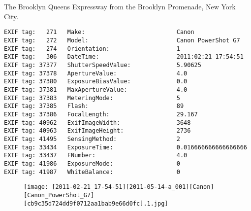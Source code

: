 \section{\protect{}}
\noindent The Brooklyn Queens Expressway from the Brooklyn Promenade, New York City.
\noindent
\begin{lstlisting}
EXIF tag:   271   Make:                          Canon
EXIF tag:   272   Model:                         Canon PowerShot G7
EXIF tag:   274   Orientation:                   1
EXIF tag:   306   DateTime:                      2011:02:21 17:54:51
EXIF tag: 37377   ShutterSpeedValue:             5.90625
EXIF tag: 37378   ApertureValue:                 4.0
EXIF tag: 37380   ExposureBiasValue:             0.0
EXIF tag: 37381   MaxApertureValue:              4.0
EXIF tag: 37383   MeteringMode:                  5
EXIF tag: 37385   Flash:                         89
EXIF tag: 37386   FocalLength:                   29.167
EXIF tag: 40962   ExifImageWidth:                3648
EXIF tag: 40963   ExifImageHeight:               2736
EXIF tag: 41495   SensingMethod:                 2
EXIF tag: 33434   ExposureTime:                  0.016666666666666666
EXIF tag: 33437   FNumber:                       4.0
EXIF tag: 41986   ExposureMode:                  0
EXIF tag: 41987   WhiteBalance:                  0

\end{lstlisting}
\clearpage
\begin{figure}
\raggedleft
\texttt{[image: [2011-02-21\_17-54-51][2011-05-14-a\_001][Canon][Canon\_PowerShot\_G7][cb9c35d724dd9f0712aa1bab9e66d0fc].1.jpg]}
\end{figure}


\clearpage
